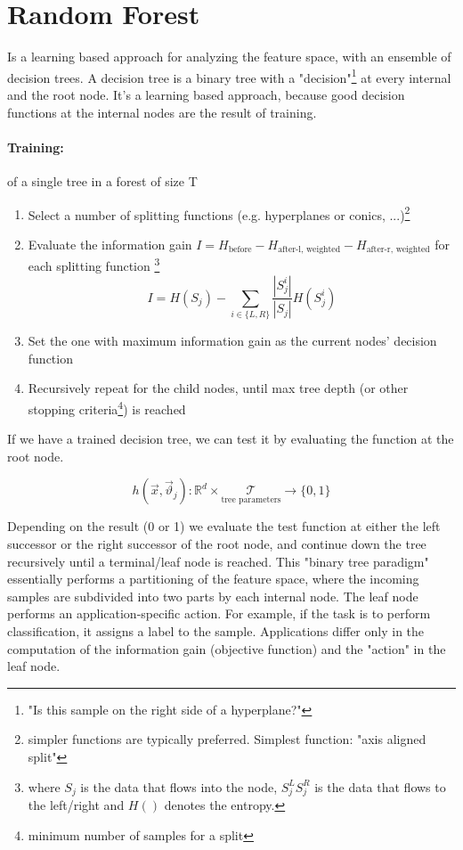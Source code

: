 
\section*{Random Forest}

Is a learning based approach for analyzing the feature space, with an ensemble of decision trees. A decision tree is a binary tree with a "decision"\footnote{"Is this sample on the right side of a hyperplane?"} at every internal and the root node. It's a learning based approach, because good decision functions at the internal nodes are the result of training.


\paragraph{Training:} of a single tree in a forest of size T
\begin{enumerate}
  \item Select a number of splitting functions (e.g. hyperplanes or conics, ...)\footnote{simpler functions are typically preferred. Simplest function: "axis aligned split"}
  \item Evaluate the information gain $I = H_{\text{before}} - H_{\text{after-l, weighted}} - H_{\text{after-r, weighted}}$ for each splitting function \footnote{where \(S_j\) is the data that flows into the node, \(S^L_j S^R_j\) is the data that flows to the left/right and \(H()\) denotes the entropy.}
  \[I = H(S_j) - \sum_{i \in \{L,R\}} \frac{|S^i_j|}{|S_j|} H(S^i_j)\]
  \item Set the one with maximum information gain as the current nodes' decision function
  \item Recursively repeat for the child nodes, until max tree depth (or other stopping criteria\footnote{minimum number of samples for a split}) is reached
\end{enumerate}

If we have a trained decision tree, we can test it by evaluating the function at the root node.

\[h(\vec{x}, \vec{\vartheta}_j): \mathbb{R}^d \times \underset{\text{tree parameters}}{\mathcal{T}} \rightarrow \{0, 1\}\]

Depending on the result (0 or 1) we evaluate the test function at either the left successor or the right successor of the root node, and continue down the tree recursively until a terminal/leaf node is reached. This "binary tree paradigm" essentially performs a partitioning of the feature space, where the incoming samples are subdivided into two parts by each internal node.
The leaf node performs an application-specific action. For example, if the task is to perform classification, it assigns a label to the sample. Applications differ only in the computation of the information gain (objective function) and the "action" in the leaf node.

